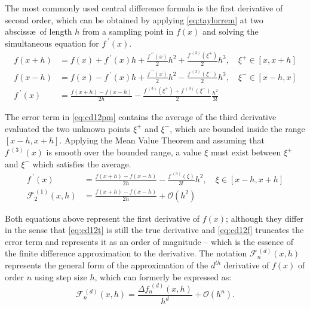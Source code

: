 The most commonly used central difference formula is the first derivative of second order, which can be obtained by applying \cref{eq:taylorrem} at two absciss\ae\ of length $h$ from a sampling point in $f(x)$ and solving the simultaneous equation for $f^{\;\prime}(x)$.
\begin{align}
f(x+h) &= f(x) + f^{\;\prime}(x)h + \frac{f^{\;\prime\prime}(x)}{2}h^2 + \frac{f^{\;(3)}(\xi^+)}{2}h^3, \quad \xi^+ \in [x,x+h] \\
f(x-h) &= f(x) - f^{\;\prime}(x)h + \frac{f^{\;\prime\prime}(x)}{2}h^2 - \frac{f^{\;(3)}(\xi^-)}{2}h^3, \quad \xi^- \in [x-h,x] \\
f^{\;\prime}(x) &= \frac{f(x+h)-f(x-h)}{2h} - \frac{f^{\;(3)}(\xi^+)+f^{\;(3)}(\xi^-)}{2}\frac{h^2}{3!}\label{eq:cd12pm}
\end{align}

The error term in \cref{eq:cd12pm} contains the average of the third derivative evaluated the two unknown points $\xi^+$ and $\xi^-$, which are bounded inside the range $[x-h,x+h]$.
Applying the Mean Value Theorem and assuming that $f^{\;(3)}(x)$ is smooth over the bounded range, a value $\xi$ must exist between $\xi^+$ and $\xi^-$ which satisfies the average.
\begin{align}
f^{\;\prime}(x) &= \frac{f(x+h)-f(x-h)}{2h} - \frac{f^{\;(3)}(\xi)}{3!}h^2, \quad \xi \in [x-h,x+h]\label{eq:cd12t} \\
\mathcal{F}_2^{\,(1)}(x,h) &= \frac{f(x+h)-f(x-h)}{2h} + \mathcal{O}(h^2)\label{eq:cd12f}
\end{align}

Both equations above represent the first derivative of $f(x)$; although they differ in the sense that \cref{eq:cd12t} is still the true derivative and \cref{eq:cd12f} truncates the error term and represents it as an order of magnitude -- which is the essence of the finite difference approximation to the derivative.
The notation $\mathcal{F}_n^{\,(d)}(x,h)$ represents the general form of the approximation of the $d^{th}$ derivative of $f(x)$ of order $n$ using step size $h$, which can formerly be expressed as:
\begin{equation}
\mathcal{F}_n^{\,(d)}(x,h) = \frac{\Delta f_n^{\;(d)}(x,h)}{h^d} + \mathcal{O}(h^n).\label{eq:cdgeneral}
\end{equation}

